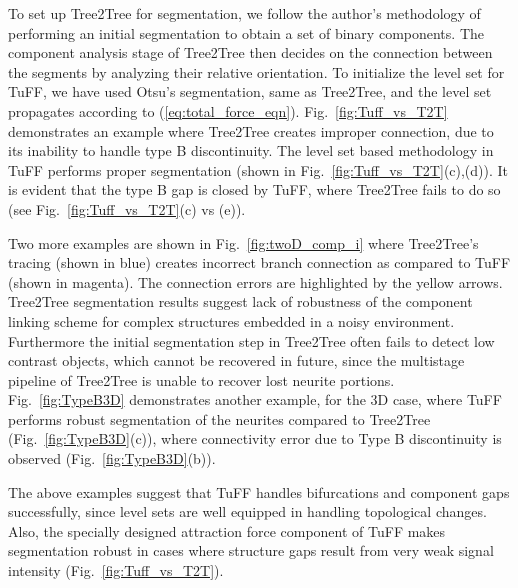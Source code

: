 To set up Tree2Tree for segmentation, we follow the author's methodology of performing an initial segmentation to obtain a set of binary components. The component analysis stage of Tree2Tree then decides on the connection between the segments by analyzing their relative orientation. To initialize the level set for TuFF, we have used Otsu's segmentation, same as Tree2Tree, and the level set propagates according to (\ref{eq:total_force_eqn}). Fig.~\ref{fig:Tuff_vs_T2T} demonstrates an example where Tree2Tree creates improper connection, due to its inability to handle type B discontinuity. The level set based methodology in TuFF performs proper segmentation (shown in Fig.~\ref{fig:Tuff_vs_T2T}(c),(d)). It is evident that the type B gap is closed by TuFF, where Tree2Tree fails to do so (see Fig.~\ref{fig:Tuff_vs_T2T}(c) vs (e)).


Two more examples are shown in Fig.~\ref{fig:twoD_comp_i} where Tree2Tree's tracing (shown in blue) creates incorrect branch connection as compared to TuFF (shown in magenta). The connection errors are highlighted by  the yellow arrows. Tree2Tree segmentation results suggest lack of robustness of the component linking scheme for complex structures embedded in a noisy environment. Furthermore the initial segmentation step in Tree2Tree often fails to detect low contrast objects, which cannot be recovered in future, since the multistage pipeline of Tree2Tree is unable to recover lost neurite portions. Fig.~\ref{fig:TypeB3D} demonstrates another example, for the 3D case, where TuFF performs robust segmentation of the neurites compared to Tree2Tree (Fig.~\ref{fig:TypeB3D}(c)), where connectivity error due to Type B discontinuity is observed (Fig.~\ref{fig:TypeB3D}(b)).   

The above examples suggest that TuFF handles bifurcations and component gaps successfully, since level sets are well equipped in handling topological changes. Also, the specially designed attraction force component of TuFF makes segmentation robust in cases where structure gaps result from very weak signal intensity (Fig.~\ref{fig:Tuff_vs_T2T}). 

